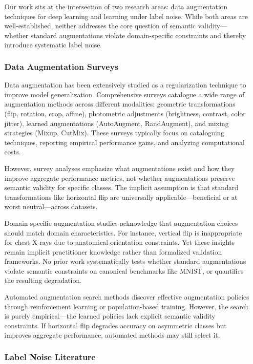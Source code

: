 
Our work sits at the intersection of two research areas: data augmentation techniques for deep learning and learning under label noise. While both areas are well-established, neither addresses the core question of semantic validity---whether standard augmentations violate domain-specific constraints and thereby introduce systematic label noise.

\subsubsection{Data Augmentation Surveys}

Data augmentation has been extensively studied as a regularization technique to improve model generalization. Comprehensive surveys catalogue a wide range of augmentation methods across different modalities: geometric transformations (flip, rotation, crop, affine), photometric adjustments (brightness, contrast, color jitter), learned augmentations (AutoAugment, RandAugment), and mixing strategies (Mixup, CutMix). These surveys typically focus on cataloguing techniques, reporting empirical performance gains, and analyzing computational costs.

However, survey analyses emphasize what augmentations exist and how they improve aggregate performance metrics, not whether augmentations preserve semantic validity for specific classes. The implicit assumption is that standard transformations like horizontal flip are universally applicable---beneficial or at worst neutral---across datasets.

Domain-specific augmentation studies acknowledge that augmentation choices should match domain characteristics. For instance, vertical flip is inappropriate for chest X-rays due to anatomical orientation constraints. Yet these insights remain implicit practitioner knowledge rather than formalized validation frameworks. No prior work systematically tests whether standard augmentations violate semantic constraints on canonical benchmarks like MNIST, or quantifies the resulting degradation.

Automated augmentation search methods discover effective augmentation policies through reinforcement learning or population-based training. However, the search is purely empirical---the learned policies lack explicit semantic validity constraints. If horizontal flip degrades accuracy on asymmetric classes but improves aggregate performance, automated methods may still select it.

\subsubsection{Label Noise Literature}

